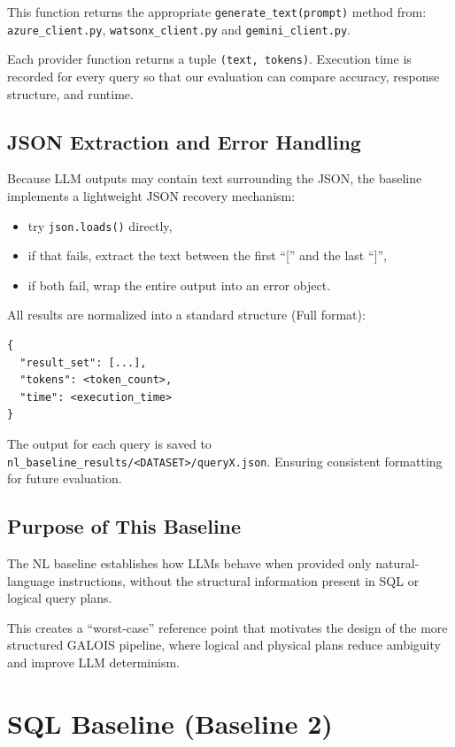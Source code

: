 \documentclass[12pt]{article}
\begin{document}
This function returns the appropriate \verb|generate_text(prompt)| method from: \texttt{azure\_client.py}, \texttt{watsonx\_client.py} and \texttt {gemini\_client.py}.

Each provider function returns a tuple \verb|(text, tokens)|. Execution time is recorded for every query so that our evaluation can compare accuracy, response structure, and runtime.


\subsection{JSON Extraction and Error Handling}

Because LLM outputs may contain text surrounding the JSON, the baseline implements a lightweight JSON recovery mechanism:
\begin{itemize}
    \item try \verb|json.loads()| directly,
    \item if that fails, extract the text between the first ``['' and the last ``]'',
    \item if both fail, wrap the entire output into an error object.
\end{itemize}

All results are normalized into a standard structure (Full format):

\begin{verbatim}
{
  "result_set": [...],
  "tokens": <token_count>,
  "time": <execution_time>
}
\end{verbatim}

The output for each query is saved to \verb|nl_baseline_results/<DATASET>/queryX.json|.
Ensuring consistent formatting for future evaluation.

\subsection{Purpose of This Baseline}

The NL baseline establishes how LLMs behave when provided only natural-language instructions, without the structural information present in SQL or logical query plans.

This creates a ``worst-case'' reference point that motivates the design of the more structured GALOIS pipeline, where logical and physical plans reduce ambiguity and improve LLM determinism.


\section{SQL Baseline (Baseline 2)}
\end{document}
